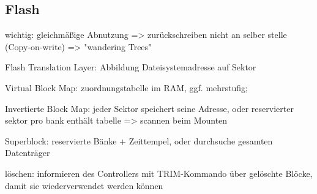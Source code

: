 \subsection{Flash}
wichtig: gleichmäßige Abnutzung => zurückschreiben nicht an selber stelle (Copy-on-write) => "wandering Trees"

Flash Translation Layer: Abbildung Dateisystemadresse auf Sektor

Virtual Block Map:  zuordnungstabelle im RAM, ggf. mehrstufig; 

Invertierte Block Map: jeder Sektor speichert seine Adresse, oder reservierter sektor pro bank enthält tabelle => scannen beim Mounten

Superblock: reservierte Bänke + Zeittempel, oder durchsuche gesamten Datenträger

löschen: informieren des Controllers mit TRIM-Kommando über gelöschte Blöcke, damit sie wiederverwendet werden können




